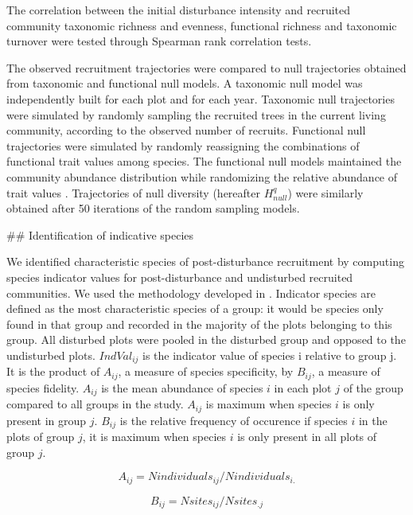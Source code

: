\documentclass[fleqn,10pt]{ArtEcoFoG} %
\begin{document}
The correlation between the initial disturbance intensity and recruited
community taxonomic richness and evenness, functional richness and
taxonomic turnover were tested through Spearman rank correlation tests.
\color{black}

The observed recruitment trajectories were compared to null trajectories
obtained from taxonomic and functional null models. A taxonomic null
model was independently built for each plot and for each year. Taxonomic
null trajectories were simulated by randomly sampling the recruited
trees in the current living community, according to the observed number
of recruits. Functional null trajectories were simulated by randomly
reassigning the combinations of functional trait values among species.
The functional null models maintained the community abundance
distribution while randomizing the relative abundance of trait values
\citep{Mason2013}. Trajectories of null diversity (hereafter
\(H^q_{null}\)) were similarly obtained after 50 iterations of the
random sampling models.

\color{red} \#\# Identification of indicative species

We identified characteristic species of post-disturbance recruitment by
computing species indicator values for post-disturbance and undisturbed
recruited communities. We used the methodology developed in
\citet{Dufrene1997}. Indicator species are defined as the most
characteristic species of a group: it would be species only found in
that group and recorded in the majority of the plots belonging to this
group. All disturbed plots were pooled in the disturbed group and
opposed to the undisturbed plots. \(IndVal_{ij}\) is the indicator value
of species i relative to group j. It is the product of \(A_{ij}\), a
measure of species specificity, by \(B_{ij}\), a measure of species
fidelity. \(A_{ij}\) is the mean abundance of species \(i\) in each plot
\(j\) of the group compared to all groups in the study. \(A_{ij}\) is
maximum when species \(i\) is only present in group \(j\). \(B_{ij}\) is
the relative frequency of occurence if species \(i\) in the plots of
group \(j\), it is maximum when species \(i\) is only present in all
plots of group \(j\).

\begin{equation}
A_{ij} = Nindividuals_{ij} / Nindividuals_{i.}
\end{equation}

\begin{equation}
B_{ij} = Nsites_{ij} / Nsites_{.j}
\end{equation}
\end{document}
